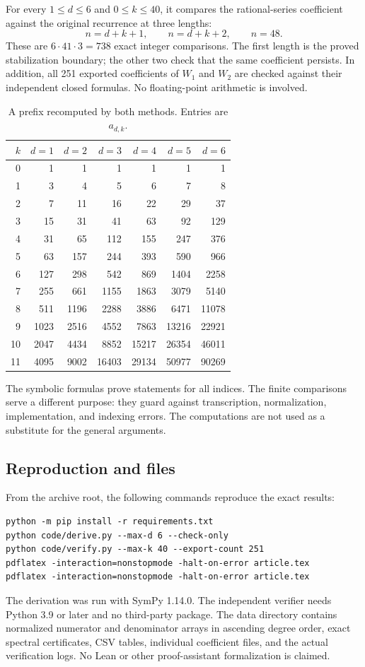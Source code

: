 \documentclass[11pt,letterpaper]{article}
\numberwithin{equation}{section}
\theoremstyle{definition}
\theoremstyle{remark}
\begin{document}
For every $1\le d\le6$ and $0\le k\le40$, it compares the rational-series
coefficient against the original recurrence at three lengths:
\[
 n=d+k+1,\qquad n=d+k+2,\qquad n=48.
\]
These are $6\cdot41\cdot3=738$ exact integer comparisons.
The first length is the proved stabilization boundary; the other two
check that the same coefficient persists. In addition, all 251 exported
coefficients of $W_1$ and $W_2$ are checked against their independent
closed formulas. No floating-point arithmetic is involved.

\begin{table}[htbp]
\centering\small
\caption{A prefix recomputed by both methods. Entries are $a_{d,k}$.}
\label{tab:prefix}
\begin{tabular}{r|rrrrrr}
\toprule
$k$ & $d=1$ & $d=2$ & $d=3$ & $d=4$ & $d=5$ & $d=6$\\
\midrule
0 &1&1&1&1&1&1\\
1 &3&4&5&6&7&8\\
2 &7&11&16&22&29&37\\
3 &15&31&41&63&92&129\\
4 &31&65&112&155&247&376\\
5 &63&157&244&393&590&966\\
6 &127&298&542&869&1404&2258\\
7 &255&661&1155&1863&3079&5140\\
8 &511&1196&2288&3886&6471&11078\\
9 &1023&2516&4552&7863&13216&22921\\
10&2047&4434&8852&15217&26354&46011\\
11&4095&9002&16403&29134&50977&90269\\
\bottomrule
\end{tabular}
\end{table}

The symbolic formulas prove statements for all indices. The finite
comparisons serve a different purpose: they guard against transcription,
normalization, implementation, and indexing errors. The computations are
not used as a substitute for the general arguments.

\subsection{Reproduction and files}
From the archive root, the following commands reproduce the exact results:
\begin{lstlisting}
python -m pip install -r requirements.txt
python code/derive.py --max-d 6 --check-only
python code/verify.py --max-k 40 --export-count 251
pdflatex -interaction=nonstopmode -halt-on-error article.tex
pdflatex -interaction=nonstopmode -halt-on-error article.tex
\end{lstlisting}
The derivation was run with SymPy 1.14.0. The independent verifier needs
Python 3.9 or later and no third-party package. The data directory contains
normalized numerator and denominator arrays in ascending degree order,
exact spectral certificates, CSV tables, individual coefficient files,
and the actual verification logs. No Lean or other proof-assistant
formalization is claimed.
\end{document}
